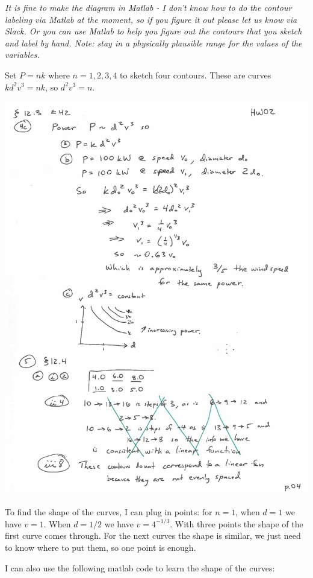 \documentclass[12pt,letterpaper]{exam}
\begin{document}
\begin{questions}
\emph{It is fine to make the diagram in Matlab - I don't know how to do the contour labeling via Matlab at the moment, so if you figure it out please let us know via Slack.  Or you can use Matlab to help you figure out the contours that you sketch and label by hand.  Note: stay in a physically plausible range for the values of the variables.}
\begin{solution}
Set $P = nk$ where $ n = 1, 2, 3, 4$ to sketch four contours.  These are curves $k d^2v^3 = n k$, so $d^2v^3 = n$.

\includegraphics{img/H02contours.pdf}

To find the shape of the curves, I can plug in points: for $n=1$, when $d = 1$ we have $v=1$.  When $d = 1/2$ we have $v = 4^{-1/3}$.  With three points the shape of the first curve comes through.  For the next curves the shape is similar, we just need to know where to put them, so one point is enough.

I can also use the following matlab code to learn the shape of the curves:


\end{solution}
\end{questions}
\end{document}
